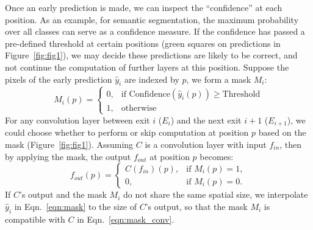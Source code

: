 Once an early prediction is made, we can inspect the ``confidence'' at each position.
As an example, for semantic segmentation, the maximum probability over all classes can serve as a confidence measure.
If the confidence has passed a pre-defined threshold at certain positions (green squares on predictions in Figure~\ref{fig:fig1}), we may decide these predictions are likely to be correct, and not continue the computation of further layers at this position.
Suppose the pixels of the early prediction $\hat{y}_i$ are indexed by $p$, we form a mask $M_i$:
\begin{equation}
\label{eqn:mask}
M_i(p) = 
\begin{cases}
    0, & \text{if Confidence}(\hat{y}_i (p)) \geq \text{Threshold} \\
    1,              & \text{otherwise}
\end{cases}
\end{equation}
For any convolution layer between exit $i$ ($E_i$) and the next exit $i+1$ ($E_{i+1}$), we could choose whether to perform or skip computation at position $p$ based on the mask (Figure~\ref{fig:fig1}).
Assuming $C$ is a convolution layer with input $f_{in}$, then by applying the mask, the output $f_{out}$ at position $p$ becomes:
\begin{equation}
\label{eqn:mask_conv}
f_{out}(p)  = 
\begin{cases}
    C(f_{in})(p), & \text{if } M_i(p) = 1, \\
    0,  & \text{if } M_i(p) = 0.
\end{cases}
\end{equation}
If $C$'s output and the mask $M_i$ do not share the same spatial size, we interpolate $\hat{y}_i$ in Eqn.~\ref{eqn:mask} to the size of $C$'s output, so that the mask $M_i$ is compatible with $C$ in Eqn.~\ref{eqn:mask_conv}.

